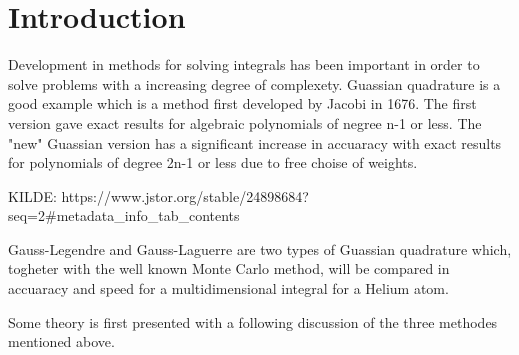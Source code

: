 \documentclass[../main.tex]{subfiles}
\begin{document}
\section{Introduction} \label{sec:intro}
Development in methods for solving integrals has been important in order to solve problems with a increasing degree of complexety. Guassian quadrature is a good example which is a method first developed by Jacobi in 1676. The first version gave exact results for algebraic polynomials of negree n-1 or less. The "new" Guassian version has a significant increase in accuaracy with exact results for polynomials of degree 2n-1 or less due to free choise of weights.


KILDE:
https://www.jstor.org/stable/24898684?seq=2#metadata_info_tab_contents

Gauss-Legendre and Gauss-Laguerre are two types of Guassian quadrature  which, togheter with the well known Monte Carlo method, will be compared in accuaracy and speed for a multidimensional integral for a Helium atom.

Some theory is first presented with a following discussion of the three methodes mentioned above.
\end{document}
